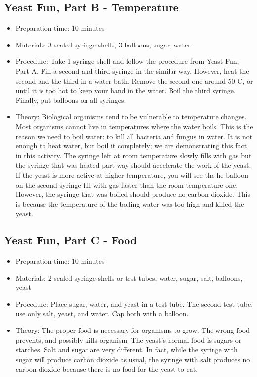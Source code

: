 \subsection{Yeast Fun, Part B - Temperature}
\begin{itemize}
\item{Preparation time: 10 minutes}
\item{Materials: 3 sealed syringe shells, 3 balloons, sugar, water}
\item{Procedure: Take 1 syringe shell and follow the procedure from Yeast Fun, Part A. Fill a second and third syringe in the similar way. However, heat the second and the third in a water bath. Remove the second one around 50 C, or until it is too hot to keep your hand in the water. Boil the third syringe. Finally, put balloons on all syringes.}
\item{Theory: Biological organisms tend to be vulnerable to temperature changes. Most organisms cannot live in temperatures where the water boils. This is the reason we need to boil water: to kill all bacteria and fungus in water. It is not enough to heat water, but boil it completely; we are demonstrating this fact in this activity. The syringe left at room temperature slowly fills with gas but the syringe that was heated part way should accelerate the work of the yeast. If the yeast is more active at higher temperature, you will see the he balloon on the second syringe fill with gas faster than the room temperature one. However, the syringe that was boiled should produce no carbon dioxide. This is because the temperature of the boiling water was too high and killed the yeast.}
\end{itemize}


\subsection{Yeast Fun, Part C - Food}
\begin{itemize}
\item{Preparation time: 10 minutes}
\item{Materials: 2 sealed syringe shells or test tubes, water, sugar, salt, balloons, yeast}
\item{Procedure: Place sugar, water, and yeast in a test tube. The second test tube, use only salt, yeast, and water. Cap both with a balloon.}
\item{Theory: The proper food is necessary for organisms to grow. The wrong food prevents, and possibly kills organism. The yeast’s normal food is sugars or starches. Salt and sugar are very different. In fact, while the syringe with sugar will produce carbon dioxide as usual, the syringe with salt produces no carbon dioxide because there is no food for the yeast to eat.}
\end{itemize}



